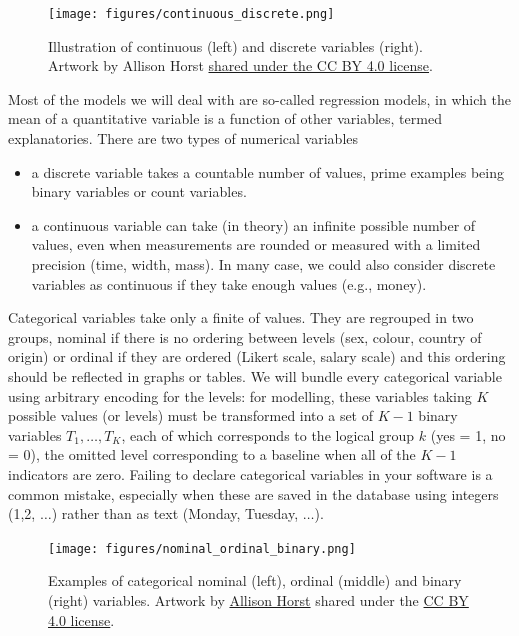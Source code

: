 \documentclass[
  11pt,
  letterpaper,
]{scrbook}
\providecommand{\tightlist}{%
  \setlength{\itemsep}{0pt}\setlength{\parskip}{0pt}}\usepackage{longtable,booktabs,array}
\theoremstyle{definition}
\theoremstyle{remark}
\begin{document}
\begin{figure}[ht!]

{\centering \texttt{[image: figures/continuous\_discrete.png]}

}

\caption{Illustration of continuous (left) and discrete variables
(right). Artwork by Allison Horst
\href{https://creativecommons.org/licenses/by/4.0/}{shared under the CC
BY 4.0 license}.}

\end{figure}

Most of the models we will deal with are so-called regression models, in
which the mean of a quantitative variable is a function of other
variables, termed explanatories. There are two types of numerical
variables

\begin{itemize}
\tightlist
\item
  a discrete variable takes a countable number of values, prime examples
  being binary variables or count variables.
\item
  a continuous variable can take (in theory) an infinite possible number
  of values, even when measurements are rounded or measured with a
  limited precision (time, width, mass). In many case, we could also
  consider discrete variables as continuous if they take enough values
  (e.g., money).
\end{itemize}

Categorical variables take only a finite of values. They are regrouped
in two groups, nominal if there is no ordering between levels (sex,
colour, country of origin) or ordinal if they are ordered (Likert scale,
salary scale) and this ordering should be reflected in graphs or tables.
We will bundle every categorical variable using arbitrary encoding for
the levels: for modelling, these variables taking \(K\) possible values
(or levels) must be transformed into a set of \(K-1\) binary variables
\(T_1, \ldots, T_K\), each of which corresponds to the logical group
\(k\) (yes = 1, no = 0), the omitted level corresponding to a baseline
when all of the \(K-1\) indicators are zero. Failing to declare
categorical variables in your software is a common mistake, especially
when these are saved in the database using integers (1,2, \(\ldots\))
rather than as text (Monday, Tuesday, \(\ldots\)).

\begin{figure}[ht!]

{\centering \texttt{[image: figures/nominal\_ordinal\_binary.png]}

}

\caption{Examples of categorical nominal (left), ordinal (middle) and
binary (right) variables. Artwork by
\href{https://www.allisonhorst.com/}{Allison Horst} shared under the
\href{https://creativecommons.org/licenses/by/4.0/}{CC BY 4.0 license}.}

\end{figure}
\end{document}
